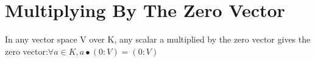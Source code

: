 \section{Multiplying By The Zero Vector}

\begin{theorem}
  \label{theorem : smul_zero}
  \leanok
  In any vector space V over K, any scalar a multiplied by the zero vector gives the zero vector:$ \forall a \in K, a \bullet (0 : V) = (0 : V)$
\end{theorem}
